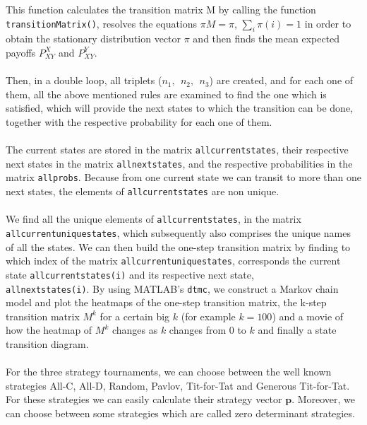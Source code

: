 \documentclass[12pt]{article}
\begin{document}
This function calculates the transition matrix M by calling the function \texttt{transitionMatrix()}, resolves the equations $\pi M=\pi$, $\sum_{i}\pi(i)=1$ in order to obtain the stationary distribution vector $\pi$ and then finds the mean expected payoffs $P_{XY}^X$ and $P_{XY}^Y$.
\\\\
Then, in a double loop, all triplets ($n_1, \ \ n_2, \ \ n_3$) are created, and for each one of them, all the above mentioned rules are examined to find the one which is satisfied, which will provide the next states to which the transition can be done, together with the respective probability for each one of them.
\\\\
The current states are stored in the matrix \texttt{allcurrentstates}, their respective next states in the matrix \texttt{allnextstates}, and the respective probabilities in the matrix \texttt{allprobs}. Because from one current state we can transit to more than one next states, the elements of \texttt{allcurrentstates} are non unique.
\\\\
We find all the unique elements of \texttt{allcurrentstates}, in the matrix \texttt{allcurrentuniquestates}, which subsequently also comprises the unique names of all the states. We can then build the one-step transition matrix by finding to which index of the matrix \texttt{allcurrentuniquestates}, corresponds the current state \texttt{allcurrentstates(i)} and its respective next state, \\\texttt{allnextstates(i)}. By using MATLAB's \texttt{dtmc}, we construct a Markov chain model and plot the heatmaps of the one-step transition matrix, the k-step transition matrix $M^k$ for a certain big $k$ (for example $k=100$) and a movie of how the heatmap of $M^k$ changes as $k$ changes from $0$ to $k$ and finally a state transition diagram.
\\\\ 
For the three strategy tournaments, we can choose between the well known strategies All-C, All-D, Random, Pavlov, Tit-for-Tat and Generous Tit-for-Tat. For these strategies we can easily calculate their strategy vector $\mathbf{p}$. Moreover, we can choose between some strategies which are called zero determinant strategies.
\\\\
\end{document}
